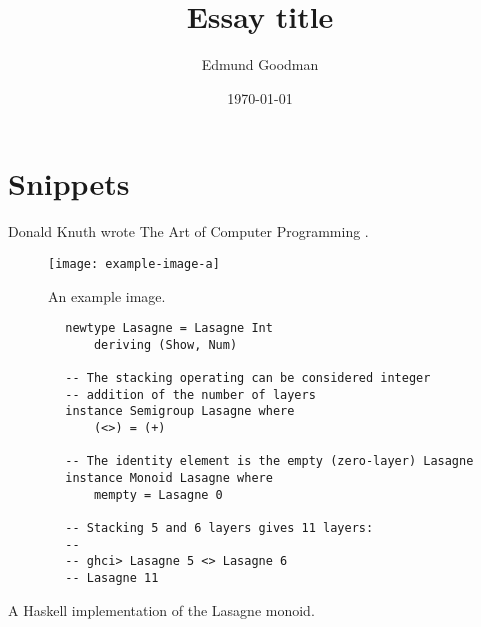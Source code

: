 \documentclass[12pt]{article}
\title{Essay title}
\author{Edmund Goodman}
\date{\today}
\begin{document}
\maketitle



\section{Snippets}
\label{sec:snippets}

Donald Knuth  wrote The Art of Computer Programming \cite{knuth1997art}.

\begin{figure}[H]
    \centering
    \texttt{[image: example-image-a]}
    \caption{An example image.}
    \label{fig:example-image-a}
\end{figure}

\begin{listing}[H]
    \begin{verbatim}
        newtype Lasagne = Lasagne Int
            deriving (Show, Num)

        -- The stacking operating can be considered integer
        -- addition of the number of layers
        instance Semigroup Lasagne where
            (<>) = (+)

        -- The identity element is the empty (zero-layer) Lasagne
        instance Monoid Lasagne where
            mempty = Lasagne 0

        -- Stacking 5 and 6 layers gives 11 layers:
        --
        -- ghci> Lasagne 5 <> Lasagne 6
        -- Lasagne 11
    \end{verbatim}
    \caption{A Haskell implementation of the Lasagne monoid.}
    \label{listing:haskell-lasagne-monoid}
\end{listing}



\printbibliography[heading=bibnumbered]
\appendix
\end{document}

